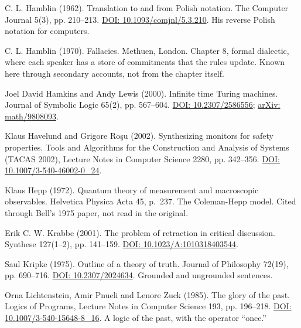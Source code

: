 \documentclass[11pt,twoside]{article}
\theoremstyle{thielethm}
\theoremstyle{thieledef}
\theoremstyle{thieledef}
\theoremstyle{thieledef}
\theoremstyle{thielethm}
\theoremstyle{thieleobs}
\theoremstyle{thielethm}
\begin{document}
\noindent C. L. Hamblin (1962). Translation to and from Polish notation. The Computer Journal 5(3), pp. 210--213. \href{https://doi.org/10.1093/comjnl/5.3.210}{DOI: 10.1093/comjnl/5.3.210}. His reverse Polish notation for computers.
\par\medskip

\noindent C. L. Hamblin (1970). Fallacies. Methuen, London. Chapter 8, formal dialectic, where each speaker has a store of commitments that the rules update. Known here through secondary accounts, not from the chapter itself.
\par\medskip

\noindent Joel David Hamkins and Andy Lewis (2000). Infinite time Turing machines. Journal of Symbolic Logic 65(2), pp. 567--604. \href{https://doi.org/10.2307/2586556}{DOI: 10.2307/2586556}; \href{https://arxiv.org/abs/math/9808093}{arXiv: math/9808093}.
\par\medskip

\noindent Klaus Havelund and Grigore Ro\c{s}u (2002). Synthesizing monitors for safety properties. Tools and Algorithms for the Construction and Analysis of Systems (TACAS 2002), Lecture Notes in Computer Science 2280, pp. 342--356. \href{https://doi.org/10.1007/3-540-46002-0_24}{DOI: 10.1007/3-540-46002-0\_24}.
\par\medskip

\noindent Klaus Hepp (1972). Quantum theory of measurement and macroscopic observables. Helvetica Physica Acta 45, p.~237. The Coleman-Hepp model. Cited through Bell's 1975 paper, not read in the original.
\par\medskip

\noindent Erik C. W. Krabbe (2001). The problem of retraction in critical discussion. Synthese 127(1--2), pp. 141--159. \href{https://doi.org/10.1023/A:1010318403544}{DOI: 10.1023/A:1010318403544}.
\par\medskip

\noindent Saul Kripke (1975). Outline of a theory of truth. Journal of Philosophy 72(19), pp. 690--716. \href{https://doi.org/10.2307/2024634}{DOI: 10.2307/2024634}. Grounded and ungrounded sentences.
\par\medskip

\noindent Orna Lichtenstein, Amir Pnueli and Lenore Zuck (1985). The glory of the past. Logics of Programs, Lecture Notes in Computer Science 193, pp. 196--218. \href{https://doi.org/10.1007/3-540-15648-8_16}{DOI: 10.1007/3-540-15648-8\_16}. A logic of the past, with the operator ``once.''
\par\medskip
\end{document}
